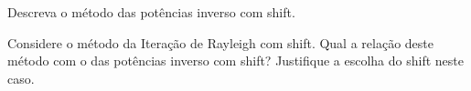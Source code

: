 \documentclass[a4paper,12pt, leqno, answers]{exam}
\begin{document}
\begin{questions}
    \question Descreva o m\'{e}todo das pot\^{e}ncias inverso com shift.
    \begin{solution}
    \end{solution}

    \question Considere o m\'{e}todo da Itera\c{c}\~{a}o de Rayleigh com shift. Qual a rela\c{c}\~{a}o deste m\'{e}todo com o das pot\^{e}ncias inverso com shift? Justifique a escolha do shift neste caso.
    \begin{solution}
    \end{solution}
\end{questions}


\end{document}
